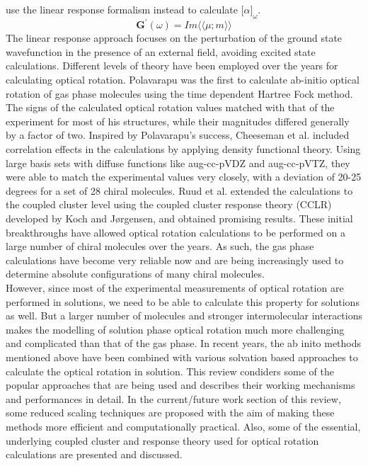 use the linear response formalism\cite{Koch90,Kobayashi94} instead to calculate
${\lbrack\alpha\rbrack}_\omega$.
\begin{equation}
\textbf{G}^{\prime}(\omega) = Im\langle\langle\mu;m\rangle\rangle
\end{equation} The linear response approach focuses on the perturbation of the
ground state wavefunction in the presence of an external field, avoiding
excited state calculations. Different levels of theory have been employed
over the years for calculating optical rotation. Polavarapu was the first to
calculate ab-initio optical rotation of gas phase molecules using the time
dependent Hartree Fock method\cite{Polavarapu96}. The signs of the calculated optical
rotation values matched with that of the experiment for most of his structures,
while their magnitudes differed generally by a factor of two. Inspired by
Polavarapu's success, Cheeseman et al. \cite{Cheeseman00,Stephens01} included correlation
effects in the calculations by applying density functional theory.
Using large basis sets with diffuse functions like aug-cc-pVDZ and aug-cc-pVTZ,\cite{Dunning89} they were able to match the experimental values very closely, with a deviation of 20-25 degrees
for a set of 28 chiral molecules. Ruud et al. extended the calculations to the
coupled cluster level using the coupled cluster response
theory (CCLR) developed by Koch and J{\o}rgensen\cite{Koch90},
and obtained promising results\cite{Ruud03}. These initial breakthroughs have allowed optical
rotation calculations to be performed on a large number of chiral molecules over the years.  As
such, the gas phase calculations have become very reliable now and are being
increasingly used to determine absolute configurations of many chiral molecules.\cite{Kondru99} \\However, since most of the experimental measurements of optical rotation are
performed in solutions, we need to be able to calculate this property for solutions
as well. But a larger number of molecules and stronger intermolecular interactions
makes the modelling of solution phase optical rotation much more challenging and
complicated than that of the gas phase. In recent years, the ab inito methods
mentioned above have been combined with various solvation based
approaches\cite{Neugebauer05,Neugebauer09,Mennucci02,Tomasi05,JensenGordon96}
to calculate the optical rotation in solution. This review condiders some of
the popular approaches that are being used and describes their working
mechanisms and performances in detail. In the current/future work section of
this review, some reduced scaling techniques are proposed with the aim of
making these methods more efficient and computationally practical. Also, some
of the essential, underlying coupled cluster and response theory used for
optical rotation calculations are presented and discussed.



